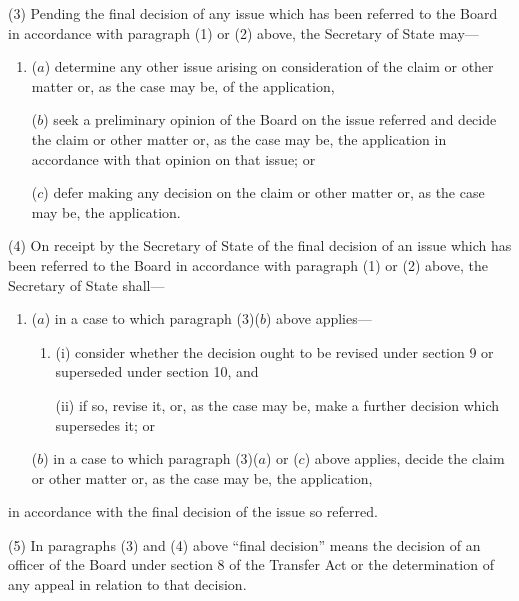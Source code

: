 \documentclass[12pt,a4paper]{article}
\begin{document}
(3) Pending the final decision of any issue which has been referred to the Board in accordance with paragraph (1) or (2) above, the Secretary of State may—
\begin{enumerate}\item[]
($a$) determine any other issue arising on consideration of the claim or other matter or, as the case may be, of the application,

($b$) seek a preliminary opinion of the Board on the issue referred and decide the claim or other matter or, as the case may be, the application in accordance with that opinion on that issue; or

($c$) defer making any decision on the claim or other matter or, as the case may be, the application.
\end{enumerate}

(4) On receipt by the Secretary of State of the final decision of an issue which has been referred to the Board in accordance with paragraph (1) or (2) above, the Secretary of State shall—
\begin{enumerate}\item[]
($a$) in a case to which paragraph (3)($b$) above applies—
\begin{enumerate}\item[]
(i) consider whether the decision ought to be revised under section 9 or superseded under section 10, and

(ii) if so, revise it, or, as the case may be, make a further decision which supersedes it; or
\end{enumerate}

($b$) in a case to which paragraph (3)($a$) or ($c$) above applies, decide the claim or other matter or, as the case may be, the application,
\end{enumerate}
in accordance with the final decision of the issue so referred.

(5) In paragraphs (3) and (4) above “final decision” means the decision of an officer of the Board under section 8 of the Transfer Act or the determination of any appeal in relation to that decision.

\end{document}
